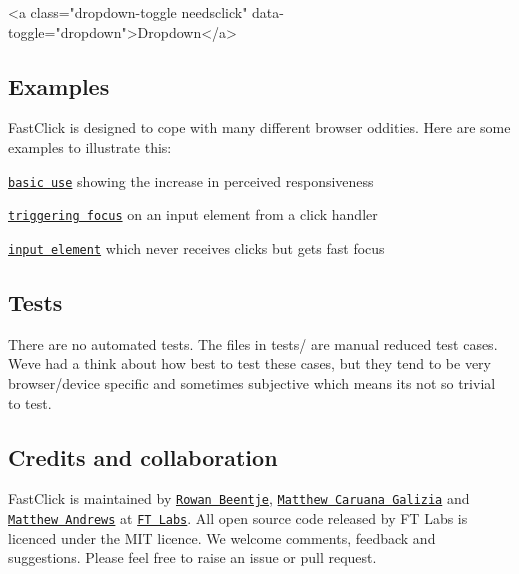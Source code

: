 \begin{DoxyCode}
<a class="dropdown-toggle needsclick" data-toggle="dropdown">Dropdown</a>
\end{DoxyCode}


\subsection*{Examples}

Fast\+Click is designed to cope with many different browser oddities. Here are some examples to illustrate this\+:


\begin{DoxyItemize}
\item \href{http://ftlabs.github.com/fastclick/examples/layer.html}{\tt basic use} showing the increase in perceived responsiveness
\item \href{http://ftlabs.github.com/fastclick/examples/focus.html}{\tt triggering focus} on an input element from a {\ttfamily click} handler
\item \href{http://ftlabs.github.com/fastclick/examples/input.html}{\tt input element} which never receives clicks but gets fast focus
\end{DoxyItemize}

\subsection*{Tests}

There are no automated tests. The files in {\ttfamily tests/} are manual reduced test cases. We\textquotesingle{}ve had a think about how best to test these cases, but they tend to be very browser/device specific and sometimes subjective which means it\textquotesingle{}s not so trivial to test.

\subsection*{Credits and collaboration}

Fast\+Click is maintained by \href{http://twitter.com/rowanbeentje}{\tt Rowan Beentje}, \href{http://twitter.com/mcaruanagalizia}{\tt Matthew Caruana Galizia} and \href{http://twitter.com/andrewsmatt}{\tt Matthew Andrews} at \href{http://labs.ft.com}{\tt FT Labs}. All open source code released by FT Labs is licenced under the M\+IT licence. We welcome comments, feedback and suggestions. Please feel free to raise an issue or pull request. 